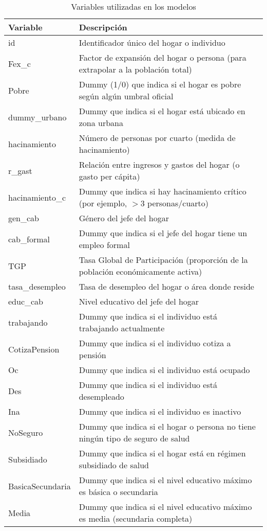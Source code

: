 \begin{table}[htbp]
\centering
\caption{Variables utilizadas en los modelos}
\label{tab:03_variables_modelos}
\begin{tabular}{p{4cm}p{9cm}}
\toprule
\textbf{Variable} & \textbf{Descripción} \\
\midrule
id & Identificador único del hogar o individuo \\
Fex\_c & Factor de expansión del hogar o persona (para extrapolar a la población total) \\
Pobre & Dummy (1/0) que indica si el hogar es pobre según algún umbral oficial \\
dummy\_urbano & Dummy que indica si el hogar está ubicado en zona urbana \\
hacinamiento & Número de personas por cuarto (medida de hacinamiento) \\
r\_gast & Relación entre ingresos y gastos del hogar (o gasto per cápita) \\
hacinamiento\_c & Dummy que indica si hay hacinamiento crítico (por ejemplo, $>$3 personas/cuarto) \\
gen\_cab & Género del jefe del hogar \\
cab\_formal & Dummy que indica si el jefe del hogar tiene un empleo formal \\
TGP & Tasa Global de Participación (proporción de la población económicamente activa) \\
tasa\_desempleo & Tasa de desempleo del hogar o área donde reside \\
educ\_cab & Nivel educativo del jefe del hogar \\
trabajando & Dummy que indica si el individuo está trabajando actualmente \\
CotizaPension & Dummy que indica si el individuo cotiza a pensión \\
Oc & Dummy que indica si el individuo está ocupado \\
Des & Dummy que indica si el individuo está desempleado \\
Ina & Dummy que indica si el individuo es inactivo \\
NoSeguro & Dummy que indica si el hogar o persona no tiene ningún tipo de seguro de salud \\
Subsidiado & Dummy que indica si el hogar está en régimen subsidiado de salud \\
BasicaSecundaria & Dummy que indica si el nivel educativo máximo es básica o secundaria \\
Media & Dummy que indica si el nivel educativo máximo es media (secundaria completa) \\

\end{tabular}
\end{table}
